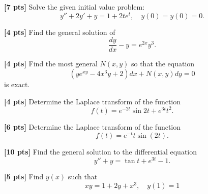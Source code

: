 \documentclass[11pt]{article}
\begin{document}
\begin{problem}
\textbf{[7 pts]} Solve the given initial value problem:
\begin{equation*}
 y'' + 2y' + y = 1 + 2te^{ t} , \quad y(0) = y (0) = 0.
\end{equation*}
\end{problem}



\begin{problem}
\textbf{[4 pts]} Find the general solution of
\begin{equation*}
 \frac{dy}{dx} -y =e^{2x}y^{3}.
\end{equation*}
\end{problem}



\begin{problem}
\textbf{[4 pts]} Find the most general $N (x, y)$ so that the equation
\begin{equation*}
     (ye ^{xy} − 4x ^{3} y + 2)dx + N (x, y)dy = 0
\end{equation*}
is exact.
\end{problem}



\begin{problem}
\textbf{[4 pts]} Determine the Laplace transform of the function
\begin{equation*}
 f(t) = e ^{−2t} \sin 2t + e ^{3t} t ^{2}.
\end{equation*}
\end{problem}



\begin{problem}
\textbf{[6 pts]} Determine the Laplace transform of the function
\begin{equation*}
 f (t) = e^{ −t} t \sin(2t) .
\end{equation*}
\end{problem}



\begin{problem}
\textbf{[10 pts]} Find the general solution to the differential equation
\begin{equation*}
y'' + y = \tan t + e ^{3t} − 1.
\end{equation*}
\end{problem}



\begin{problem}
\textbf{[5 pts]} Find $y(x)$ such that
\begin{equation*}
 xy = 1 + 2y + x ^{3}, \quad y(1) = 1
\end{equation*}
\end{problem}
\end{document}
